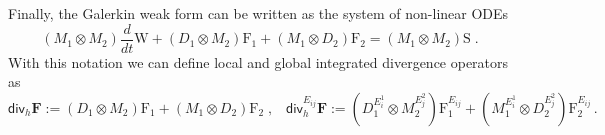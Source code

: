 \documentclass[a4paper,10pt]{article}
\begin{document}
Finally, the Galerkin weak form can be written  as the system of  non-linear ODEs
\begin{equation}\label{eq:weakG1}
(M_1\otimes  M_2)  \dfrac{d }{dt} \mathrm{W} +(D_1\otimes  M_2)   \mathrm{F}_1  +(M_1\otimes  D_2)  \mathrm{F}_2=
(M_1\otimes  M_2)  \mathrm{S}\;.
\end{equation}
With this notation we can define local and global integrated divergence operators as
 \begin{equation}\label{eq:weakG2}
 \textsf{div}_h \mathbf{F}  :=  (D_1\otimes  M_2)   \mathrm{F}_1  +(M_1\otimes  D_2)  \mathrm{F}_2\;,\;\;\;
 \textsf{div}_h^{E_{ij}}\mathbf{F} := (D_1^{E_i^{1}}\otimes M_2^{E_j^{2}}) \mathrm{F}_1^{E_{ij}} + (M_1^{E_i^{1}}\otimes D_2^{E_j^{2}}) \mathrm{F}_2^{E_{ij}}\,.
 \end{equation}
% 
% 
\end{document}
